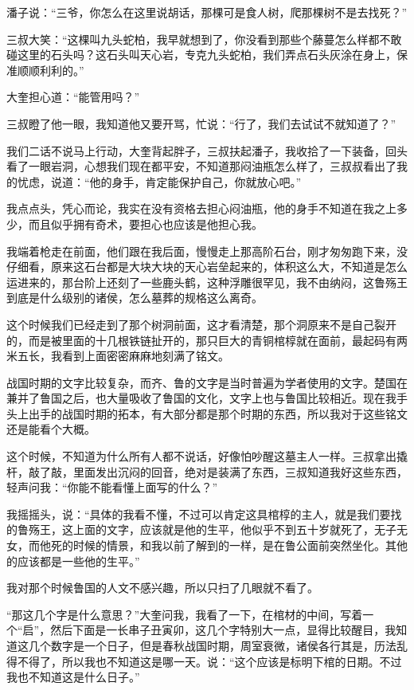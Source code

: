 潘子说：“三爷，你怎么在这里说胡话，那棵可是食人树，爬那棵树不是去找死？”

三叔大笑：“这棵叫九头蛇柏，我早就想到了，你没看到那些个藤蔓怎么样都不敢碰这里的石头吗？这石头叫天心岩，专克九头蛇柏，我们弄点石头灰涂在身上，保准顺顺利利的。”

大奎担心道：“能管用吗？”

三叔瞪了他一眼，我知道他又要开骂，忙说：“行了，我们去试试不就知道了？”

我们二话不说马上行动，大奎背起胖子，三叔扶起潘子，我收拾了一下装备，回头看了一眼岩洞，心想我们现在都平安，不知道那闷油瓶怎么样了，三叔叔看出了我的忧虑，说道：“他的身手，肯定能保护自己，你就放心吧。”

我点点头，凭心而论，我实在没有资格去担心闷油瓶，他的身手不知道在我之上多少，而且似乎拥有奇术，要担心也应该是他担心我。

我端着枪走在前面，他们跟在我后面，慢慢走上那高阶石台，刚才匆匆跑下来，没仔细看，原来这石台都是大块大块的天心岩垒起来的，体积这么大，不知道是怎么运进来的，那台阶上还刻了一些鹿头鹤，这种浮雕很罕见，我不由纳闷，这鲁殇王到底是什么级别的诸侯，怎么墓葬的规格这么离奇。

这个时候我们已经走到了那个树洞前面，这才看清楚，那个洞原来不是自己裂开的，而是被里面的十几根铁链扯开的，那只巨大的青铜棺椁就在面前，最起码有两米五长，我看到上面密密麻麻地刻满了铭文。

战国时期的文字比较复杂，而齐、鲁的文字是当时普遍为学者使用的文字。楚国在兼并了鲁国之后，也大量吸收了鲁国的文化，文字上也与鲁国比较相近。现在我手头上出手的战国时期的拓本，有大部分都是那个时期的东西，所以我对于这些铭文还是能看个大概。

这个时候，不知道为什么所有人都不说话，好像怕吵醒这墓主人一样。三叔拿出撬杆，敲了敲，里面发出沉闷的回音，绝对是装满了东西，三叔知道我好这些东西，轻声问我：“你能不能看懂上面写的什么？”

我摇摇头，说：“具体的我看不懂，不过可以肯定这具棺椁的主人，就是我们要找的鲁殇王，这上面的文字，应该就是他的生平，他似乎不到五十岁就死了，无子无女，而他死的时候的情景，和我以前了解到的一样，是在鲁公面前突然坐化。其他的应该都是一些他的生平。”

我对那个时候鲁国的人文不感兴趣，所以只扫了几眼就不看了。

“那这几个字是什么意思？”大奎问我，我看了一下，在棺材的中间，写着一个“启”，然后下面是一长串子丑寅卯，这几个字特别大一点，显得比较醒目，我知道这几个数字是一个日子，但是春秋战国时期，周室衰微，诸侯各行其是，历法乱得不得了，所以我也不知道这是哪一天。说：“这个应该是标明下棺的日期。不过我也不知道这是什么日子。”

